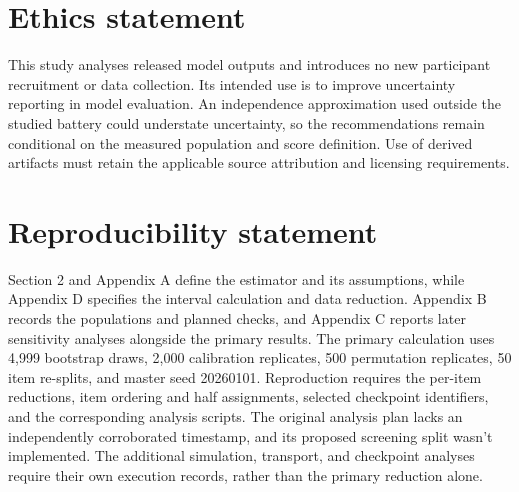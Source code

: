 \documentclass{article}
\begin{document}
\section*{Ethics statement}
This study analyses released model outputs and introduces no new participant recruitment or data collection. Its intended use is to improve uncertainty reporting in model evaluation. An independence approximation used outside the studied battery could understate uncertainty, so the recommendations remain conditional on the measured population and score definition. Use of derived artifacts must retain the applicable source attribution and licensing requirements.

\section*{Reproducibility statement}
Section 2 and Appendix A define the estimator and its assumptions, while Appendix D specifies the interval calculation and data reduction. Appendix B records the populations and planned checks, and Appendix C reports later sensitivity analyses alongside the primary results. The primary calculation uses 4,999 bootstrap draws, 2,000 calibration replicates, 500 permutation replicates, 50 item re-splits, and master seed 20260101. Reproduction requires the per-item reductions, item ordering and half assignments, selected checkpoint identifiers, and the corresponding analysis scripts. The original analysis plan lacks an independently corroborated timestamp, and its proposed screening split wasn't implemented. The additional simulation, transport, and checkpoint analyses require their own execution records, rather than the primary reduction alone.


\clearpage
\appendix


\end{document}
